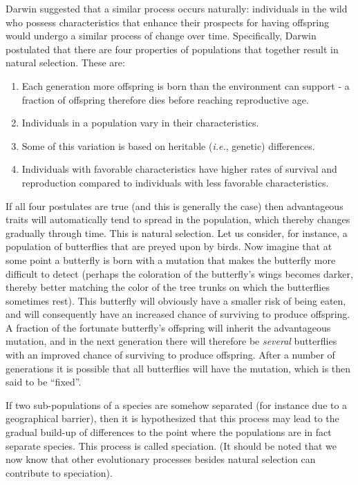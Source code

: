 \documentclass[11pt,a4paper]{book}
\begin{document}
Darwin suggested that a similar process occurs naturally: individuals in the wild who possess characteristics that enhance their prospects for having offspring would undergo a similar process of change over time. Specifically, Darwin postulated that there are four properties of populations that together result in natural selection. These are:
\begin{enumerate}
\item Each generation more offspring is born than the environment can support - a fraction of offspring therefore dies before reaching reproductive age. 
\item Individuals in a population vary in their characteristics.
\item Some of this variation is based on heritable (\emph{i.e.}, genetic) differences.
\item Individuals with favorable characteristics have higher rates of survival and reproduction compared to individuals with less favorable characteristics.
\end{enumerate}
If all four postulates are true (and this is generally the case) then advantageous traits will automatically tend to spread in the population, which thereby changes gradually through time. This is natural selection. Let us consider, for instance, a population of butterflies that are preyed upon by birds. Now imagine that at some point a butterfly is born with a mutation that makes the butterfly more difficult to detect (perhaps the coloration of the butterfly's wings becomes darker, thereby better matching the color of the tree trunks on which the butterflies sometimes rest). This butterfly will obviously have a smaller risk of being eaten, and will consequently have an increased chance of surviving to produce offspring. A fraction of the fortunate butterfly's offspring will inherit the advantageous mutation, and in the next generation there will therefore be \emph{several} butterflies with an improved chance of surviving to produce offspring. After a number of generations it is possible that all butterflies will have the mutation, which is then said to be ``fixed''. 

If two sub-populations of a species are somehow separated (for instance due to a geographical barrier), then it is hypothesized that this process may lead to the gradual build-up of differences to the point where the populations are in fact separate species. This process is called speciation. (It should be noted that we now know that other evolutionary processes besides natural selection can contribute to speciation).
\end{document}
